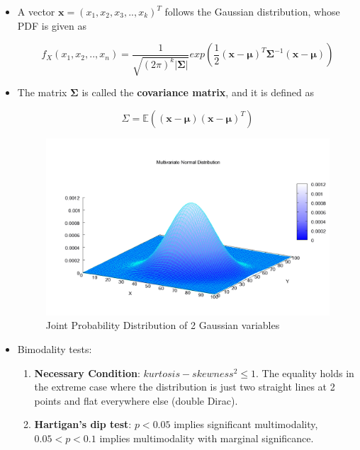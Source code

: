 \documentclass{article}
\theoremstyle{plain}
\theoremstyle{definition}
\begin{document}
\begin{itemize}
    \item A vector $\mathbf{x} = (x_1, x_2, x_3, .., x_k)^T$ follows the Gaussian distribution, whose PDF is given as 
    
    \begin{equation}
        f_X(x_1, x_2, .., x_n) =  \frac{1}{\sqrt{ (2\pi)^k | \mathbf{\Sigma} |}}exp(\frac{1}{2} (\mathbf{x} - \mathbf{\mu} )^T \mathbf{\Sigma}^{-1} (\mathbf{x} - \mathbf{\mu}))
    \end{equation}
    
    \item The matrix $\mathbf{\Sigma}$ is called the \textbf{covariance matrix}, and it is defined as
    
    \begin{equation}
        \Sigma = \mathbb{E}((\mathbf{x} - \mathbf{\mu})(\mathbf{x} - \mathbf{\mu})^T)
    \end{equation}
    
    \begin{figure}[ht]
        \centering
        \includegraphics[scale = 0.3]{da3.png}
        \caption{Joint Probability Distribution of 2 Gaussian variables}
        \label{fig:my_label_3}
    \end{figure}
    
    \item Bimodality tests:
    \begin{enumerate}
        \item \textbf{Necessary Condition}: $kurtosis - skewness^2 \leq 1$.
        The equality holds in the extreme case where the distribution is just two straight lines at 2 points and flat everywhere else (double Dirac).
        
        \item \textbf{Hartigan's dip test}: $p < 0.05$ implies significant multimodality, $0.05 < p < 0.1$ implies multimodality with marginal significance. 
    \end{enumerate}
\end{itemize}
\end{document}
